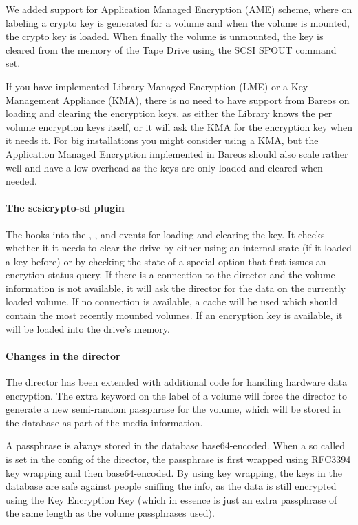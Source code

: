 We added support for Application Managed Encryption (AME) scheme, where on labeling a crypto key is generated for a volume and when the volume is mounted, the crypto key is loaded. When finally the volume is unmounted, the key is cleared from the memory of the Tape Drive using the SCSI SPOUT command set.

If you have implemented Library Managed Encryption (LME) or a Key Management Appliance (KMA), there is no need to have support from Bareos on loading and clearing the encryption keys, as either the Library knows the per volume encryption keys itself, or it will ask the KMA for the encryption key when it needs it. For big installations you might consider using a KMA, but the Application Managed Encryption implemented in Bareos should also scale rather well and have a low overhead as the keys are only loaded and cleared when needed.

\paragraph{The scsicrypto-sd plugin}

The  hooks into the , ,  and  events for loading and clearing the key. It checks whether it it needs to clear the drive by either using an internal state (if it loaded a key before) or by checking the state of a special option that first issues an encrytion status query. If there is a connection to the director and the volume information is not available, it will ask the director for the data on the currently loaded volume. If no connection is available, a cache will be used which should contain the most recently mounted volumes. If an encryption key is available, it will be loaded into the drive's memory.

\paragraph{Changes in the director}

The director has been extended with additional code for handling hardware data encryption. The extra keyword  on the label of a volume will force the director to generate a new semi-random passphrase for the volume, which will be stored in the database as part of the media information.

A passphrase is always stored in the database base64-encoded. When a so called  is set in the config of the director, the passphrase is first wrapped using RFC3394 key wrapping and then base64-encoded. By using key wrapping, the keys in the database are safe against people sniffing the info, as the data is still encrypted using the Key Encryption Key (which in essence is just an extra passphrase of the same length as the volume passphrases used).

